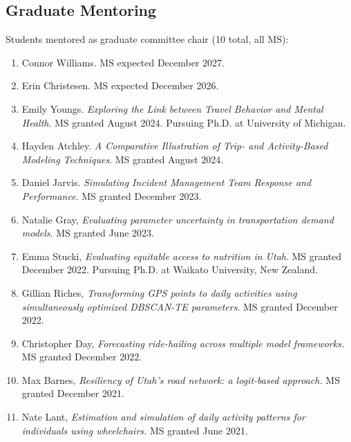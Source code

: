 \documentclass[margin,line]{res}
\newif\ifdetail{}
\newcounter{enuminitialize}
\newenvironment{myenum}[1][]
{%
 \setcounter{enuminitialize}{#1}
 \addtocounter{enuminitialize}{2}
 \begin{enumerate}[left= 4pt, itemsep=8pt, start=\value{enuminitialize}, label=\arabic*\addtocounter{enumi}{-2}]
}
{%
 \end{enumerate}
}
\begin{document}
\begin{resume}
\section{Graduate Mentoring}
Students mentored as graduate committee chair (10 total, all MS):
\vspace{0.3cm}
\begin{myenum}[11]
  \ifdetail {\color{NavyBlue} \fi
  \item Connor Williams. MS expected December 2027.
  \item Erin Christesen. MS expected December 2026.
  \ifdetail } \fi
  \item Emily Youngs. \textit{Exploring the Link between Travel Behavior and Mental Health}. MS granted August 2024. Pursuing Ph.D. at University of Michigan.
  \item Hayden Atchley. \textit{A Comparative Illustration of Trip- and Activity-Based Modeling Techniques}. MS granted August 2024.
  \item Daniel Jarvis. \textit{Simulating Incident Management Team Response and Performance}. MS granted December 2023.
  \item Natalie Gray, \textit{Evaluating parameter uncertainty in transportation demand models}. MS granted June 2023.
  \item Emma Stucki, \textit{Evaluating equitable access to nutrition in Utah}. MS granted December 2022. Pursuing Ph.D. at Waikato University, New Zealand.
  \item Gillian Riches, \textit{Transforming GPS points to daily activities using simultaneously optimized DBSCAN-TE parameters}. MS granted December 2022.
  \item Christopher Day, \textit{Forecasting ride-hailing across multiple model frameworks.} MS granted December 2022.
  \item Max Barnes, \textit{Resiliency of Utah's road network: a logit-based approach.} MS granted December 2021.
  \item Nate Lant, \textit{Estimation and simulation of daily activity patterns for individuals using wheelchairs.} MS granted June 2021.
\end{myenum}


\end{resume}
\end{document}
